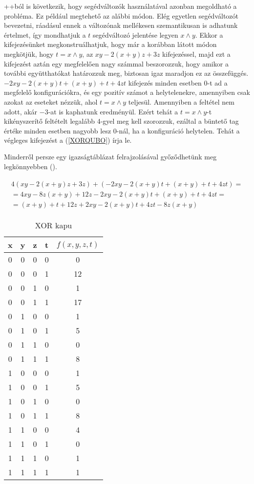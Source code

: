 \Az++ból is következik, hogy segédváltozók használatával azonban megoldható a probléma. Ez például megtehető az alábbi módon. Elég egyetlen segédváltozót bevezetni, ráadásul ennek a változónak mellékesen szemantikusan is adhatunk értelmet, így mondhatjuk a $t$ segédváltozó jelentése legyen $x \wedge y$.
Ekkor a kifejezésünket megkonstruálhatjuk, hogy már a korábban látott módon megkötjük, hogy $t = x \wedge y$, az $xy-2(x+y)z+3z$ kifejezéssel, majd ezt a kifejezést aztán egy megfelelően nagy számmal beszorozzuk, hogy amikor a további együtthatókat határozzuk meg, biztosan igaz maradjon ez az összefüggés. $-2xy-2(x+y)t+(x+y)+t+4zt$ kifejezés minden esetben $0$-t ad a megfelelő konfigurációkra, és egy pozitív számot a helytelenekre, amennyiben csak azokat az eseteket nézzük, ahol $t = x \wedge  y$ teljesül. Amennyiben a feltétel nem adott, akár $-3$-at is kaphatunk eredményül. Ezért tehát a $t = x \wedge  y$-t kikényszerítő feltételt legalább 4-gyel meg kell szorozzuk, ezáltal a büntető tag értéke minden esetben nagyobb lesz $0$-nál, ha a konfiguráció helytelen. Tehát a végleges kifejezést a (\ref{XORQUBO}) írja le.

Minderről persze egy igazságtáblázat felrajzolásával győződhetünk meg legkönnyebben ().


\begin{align}
\begin{split} \label{XORQUBO}
	4(xy-2(x+y)z+3z)+(-2xy-2(x+y)t+(x+y)+t+4zt) = \\
    = 4xy-8z(x+y)+12z-2xy-2(x+y)t+(x+y)+t+4zt = \\
	= (x+y)+t+12z+2xy-2(x+y)t+4zt-8z(x+y)	
\end{split}
\end{align}

\begin{table}[ht]
	\footnotesize
	\centering
	\begin{tabular}{ c c c c c }
		\toprule
		x & y & z & t & $f(x,y,z,t)$ \\
		\midrule
		0 & 0 & 0 & 0 & 0 \\
		0 & 0 & 0 & 1 & 12 \\
		0 & 0 & 1 & 0 & 1 \\
		0 & 0 & 1 & 1 & 17 \\
		0 & 1 & 0 & 0 & 1 \\
		0 & 1 & 0 & 1 & 5 \\
		0 & 1 & 1 & 0 & 0 \\
		0 & 1 & 1 & 1 & 8 \\		
		1 & 0 & 0 & 0 & 1 \\
		1 & 0 & 0 & 1 & 5 \\
		1 & 0 & 1 & 0 & 0 \\
		1 & 0 & 1 & 1 & 8 \\
		1 & 1 & 0 & 0 & 4 \\
		1 & 1 & 0 & 1 & 0 \\
		1 & 1 & 1 & 0 & 1 \\
		1 & 1 & 1 & 1 & 1 \\		
		\bottomrule
	\end{tabular}
	\caption{XOR kapu}
	\label{tab:XORgate}
\end{table}

